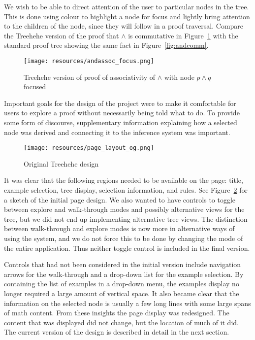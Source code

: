 \documentclass[journal]{vgtc}                %
\newcommand{\projectname}{Treehehe}
\begin{document}
We wish to be able to direct attention of the user to particular nodes in the tree. This is done using colour to highlight a node for focus and lightly bring attention to the children of the node, since they will follow in a proof traversal. Compare the \projectname{} version of the proof that $\wedge$ is commutative in Figure~\ref{fig:andcommtreehehe} with the standard proof tree showing the same fact in Figure~\ref{fig:andcomm}.

\begin{figure}[h]

\texttt{[image: resources/andassoc\_focus.png]}

\caption{\projectname{} version of proof of associativity of $\wedge$ with node $p \wedge q$ focused}
\label{fig:andcommtreehehe}
\end{figure}

Important goals for the design of the project were to make it comfortable for users to explore a proof without necessarily being told what to do. To provide some form of discourse, supplementary information explaining how a selected node was derived and connecting it to the inference system was important.

\begin{figure}

\texttt{[image: resources/page\_layout\_og.png]}

\caption{Original \projectname{} design}
\label{fig:layoutog}

\end{figure}

It was clear that the following regions needed to be available on the page: title, example selection, tree display, selection information, and rules. See Figure~\ref{fig:layoutog} for a sketch of the initial page design. We also wanted to have controls to toggle between explore and walk-through modes and possibly alternative views for the tree, but we did not end up implementing alternative tree views. The distinction between walk-through and explore modes is now more in alternative ways of using the system, and we do not force this to be done by changing the mode of the entire application. Thus neither toggle control is included in the final version.

Controls that had not been considered in the initial version include navigation arrows for the walk-through and a drop-down list for the example selection. By containing the list of examples in a drop-down menu, the examples display no longer required a large amount of vertical space. It also became clear that the information on the selected node is usually a few long lines with some large spans of math content. From these insights the page display was redesigned. The content that was displayed did not change, but the location of much of it did. The current version of the design is described in detail in the next section.
\end{document}
